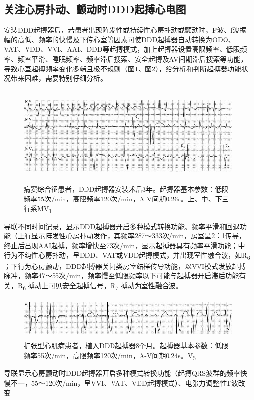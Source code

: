 \protect\hypertarget{text00045.htmlux5cux23subid499}{}{}

\subsection{关注心房扑动、颤动时DDD起搏心电图}

安装DDD起搏器后，若患者出现阵发性或持续性心房扑动或颤动时，F波、f波振幅的高低、频率的快慢及下传心室等因素可使DDD起搏器自动转换为ODO、VAT、VDD、VVI、AAI、DDD等起搏模式，加上起搏器设置高限频率、低限频率、频率平滑、睡眠频率、频率滞后搜索、安全起搏及AV间期滞后搜索等功能，导致心室起搏频率变化多端且极不规则（图\ref{fig38-35}、图\ref{fig38-36}），给分析和判断起搏器功能状况带来困难，需要特别仔细分析。

\begin{figure}[!htbp]
 \centering
 \includegraphics[width=5.58333in,height=1.94792in]{./images/Image00638.jpg}
 \captionsetup{justification=centering}
 \caption{病窦综合征患者，DDD起搏器安装术后3年。起搏器基本参数：低限频率55次/min，高限频率120次/min，A-V间期0.26s。上、中、下三行系MV\textsubscript{1}}
 \label{fig38-35}
  \end{figure} 
导联不同时间记录，显示DDD起搏器开启多种模式转换功能、频率平滑和回退功能（上行显示阵发性心房扑动发作，其频率287～333次/min，房室呈2：1传导，终止后出现AAI起搏，频率增快至73次/min，显示起搏器具有频率平滑功能；中行为不纯性心房扑动，呈DDD、VAT或VDD起搏模式，并出现室性融合波，如R\textsubscript{6}
；下行为心房颤动，DDD起搏器关闭类房室结样传导功能，以VVI模式发放起搏脉冲，频率47～55次/min，频率慢至低限频率以下可能与起搏器开启滞后功能有关，R\textsubscript{6}
搏动上可见安全起搏信号，R\textsubscript{7} 搏动为室性融合波。

\begin{figure}[!htbp]
 \centering
 \includegraphics[width=5.58333in,height=0.85417in]{./images/Image00639.jpg}
 \captionsetup{justification=centering}
 \caption{扩张型心肌病患者，植入DDD起搏器8个月。起搏器基本参数：低限频率55次/min，高限频率120次/min，A-V间期0.24s。V\textsubscript{5}}
 \label{fig38-36}
  \end{figure} 
导联显示心房颤动时DDD起搏器开启多种模式转换功能（起搏QRS波群的频率快慢不一，55～120次/min，呈VVI、VAT、VDD起搏模式）、电张力调整性T波改变

